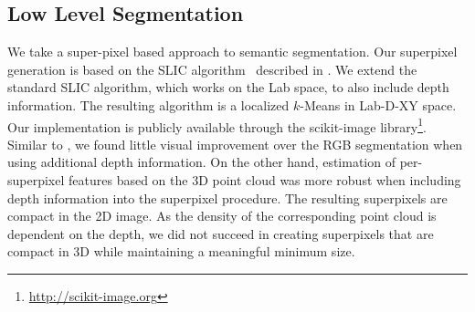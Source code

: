 \subsection{Low Level Segmentation}
We take a super-pixel based approach to semantic segmentation.
Our superpixel generation is based on the SLIC
algorithm~\citep{achanta2012slic} described in . We
extend the standard SLIC algorithm, which works on the Lab space, to also
include depth information. The resulting algorithm is a localized $k$-Means in
Lab-D-XY space.
Our implementation is publicly available through the scikit-image library\footnote{\url{http://scikit-image.org}}.
Similar to \citet{SilbermanECCV12}, we found little visual improvement over the
RGB segmentation when using additional depth information. On the other hand,
estimation of per-superpixel features based on the 3D point cloud was more
robust when including depth information into the superpixel procedure.
The resulting superpixels are compact in the 2D image. As the density of the
corresponding point cloud is dependent on the depth, we did not succeed in
creating superpixels that are compact in 3D while maintaining a meaningful
minimum size.


